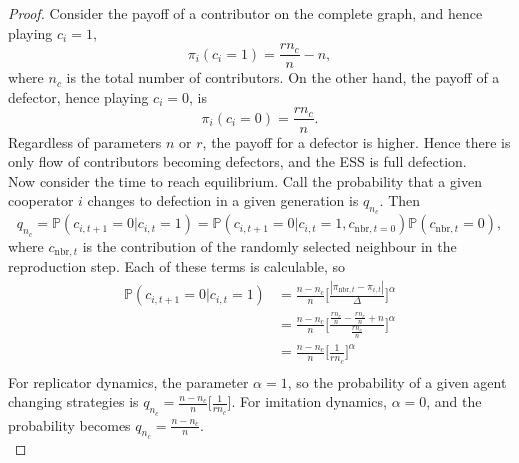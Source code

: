 \begin{proof}
Consider the payoff of a contributor on the complete graph, and hence playing $c_i = 1$, $$\pi_i(c_i = 1) = \frac{r n_c}{n} - n,  $$ where $n_c$ is the total number of contributors. On the other hand, the payoff of a defector, hence playing $c_i = 0$, is $$\pi_i(c_i = 0) = \frac{r n_c}{n}. $$ Regardless of parameters $n$ or $r$, the payoff for a defector is higher. Hence there is only flow of contributors becoming defectors, and the ESS is full defection. \\

Now consider the time to reach equilibrium. Call the probability that a given cooperator $i$ changes to defection in a given generation is $q_{n_c}$. Then  $$q_{n_c} = \mathbb P(c_{i,t+1} = 0 | c_{i,t} = 1) = \mathbb P (c_{i,t+1} = 0 | c_{i,t} =1, c_{\text{nbr}, t = 0})\mathbb P(c_{\text{nbr},t} = 0), $$ where $c_{\text{nbr},t}$ is the contribution of the randomly selected neighbour in the reproduction step. Each of these terms is calculable, so \\
\begin{align*}
    \mathbb P(c_{i,t+1} = 0 | c_{i,t} = 1) &= \frac{n-n_c}{n}\Bigg[ \frac{|\pi_{\text{nbr},t} - \pi_{i,t}|}{\Delta} \Bigg]^\alpha\\
    &= \frac{n-n_c}{n}\Bigg[ \frac{\tfrac{rn_c}{n} - \tfrac{rn_c}{n} +n}{\tfrac{rn_c}{n}} \Bigg]^\alpha\\
    &= \frac{n-n_c}{n}\Bigg[ \frac{1}{rn_c} \Bigg]^\alpha\\
\end{align*}
For replicator dynamics, the parameter $\alpha = 1$, so the probability of a given agent changing strategies is $ q_{n_c} = \frac{n-n_c}{n}\Bigg[ \frac{1}{rn_c} \Bigg]$. For imitation dynamics, $\alpha = 0$, and the probability becomes $q_{n_c} = \frac{n-n_c}{n}$. \\


\end{proof}
